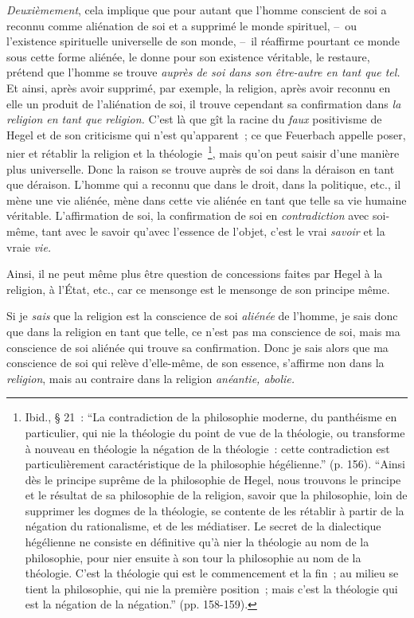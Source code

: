 \documentclass[french,twoside]{book} %
\begin{document}
\emph{Deuxièmement}, cela implique que pour autant que l’homme conscient de soi a reconnu comme aliénation de soi et a supprimé le monde spirituel, – ou l’existence spirituelle universelle de son monde, – il réaffirme pourtant ce monde sous cette forme aliénée, le donne pour son existence véritable, le restaure, prétend que l’homme se trouve \emph{auprès de soi dans son être-autre en tant que tel.} Et ainsi, après avoir supprimé, par exemple, la religion, après avoir reconnu en elle un produit de l’aliénation de soi, il trouve cependant sa confirmation dans \emph{la religion en tant que religion.} C’est là que gît la racine du \emph{faux} positivisme de Hegel et de son criticisme qui n’est qu’apparent ; ce que Feuerbach appelle poser, nier et rétablir la religion et la théologie \footnote{Ibid., § 21 : “La contradiction de la philosophie moderne, du panthéisme en particulier, qui nie la théologie du point de vue de la théologie, ou transforme à nouveau en théologie la négation de la théologie : cette contradiction est particulièrement caractéristique de la philosophie hégélienne.” (p. 156). “Ainsi dès le principe suprême de la philosophie de Hegel, nous trouvons le principe et le résultat de sa philosophie de la religion, savoir que la philosophie, loin de supprimer les dogmes de la théologie, se contente de les rétablir à partir de la négation du rationalisme, et de les médiatiser. Le secret de la dialectique hégélienne ne consiste en définitive qu’à nier la théologie au nom de la philosophie, pour nier ensuite à son tour la philosophie au nom de la théologie. C’est la théologie qui est le commencement et la fin ; au milieu se tient la philosophie, qui nie la première position ; mais c’est la théologie qui est la négation de la négation.” (pp. 158-159).}, mais qu’on peut saisir d’une manière plus universelle. Donc la raison se trouve auprès de soi dans la déraison en tant que déraison. L’homme qui a reconnu que dans le droit, dans la politique, etc., il mène une vie aliénée, mène dans cette vie aliénée en tant que telle sa vie humaine véritable. L’affirmation de soi, la confirmation de soi en \emph{contradiction} avec soi-même, tant avec le savoir qu’avec l’essence de l’objet, c’est le vrai \emph{savoir} et la vraie \emph{vie.}\par
Ainsi, il ne peut même plus être question de concessions faites par Hegel à la religion, à l’État, etc., car ce mensonge est le mensonge de son principe même.\par
[XXIX] Si je \emph{sais} que la religion est la conscience de soi \emph{aliénée} de l’homme, je sais donc que dans la religion en tant que telle, ce n’est pas ma conscience de soi, mais ma conscience de soi aliénée qui trouve sa confirmation. Donc je sais alors que ma conscience de soi qui relève d’elle-même, de son essence, s’affirme non dans la \emph{religion}, mais au contraire dans la religion \emph{anéantie, abolie.}\par
\end{document}
